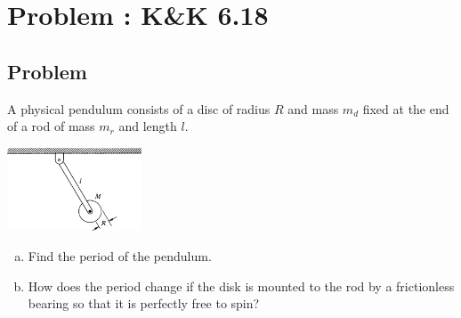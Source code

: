 \documentclass[solutions]{esg8012pset}
\begin{document}
\section{Problem \thesection: K\&K 6.18}
\subsection{Problem}
  A physical pendulum consists of a disc of radius $R$ and mass $m_d$ fixed at the end of a rod of mass $m_r$ and length $l$.
  \begin{center}\includegraphics[width=0.3\textwidth]{ps09_2}\end{center}
  \begin{enumerate}[(a)]
    \item Find the period of the pendulum.
    \item How does the period change if the disk is mounted to the rod by a frictionless bearing so that it is perfectly free to spin?
  \end{enumerate}
\end{document}
